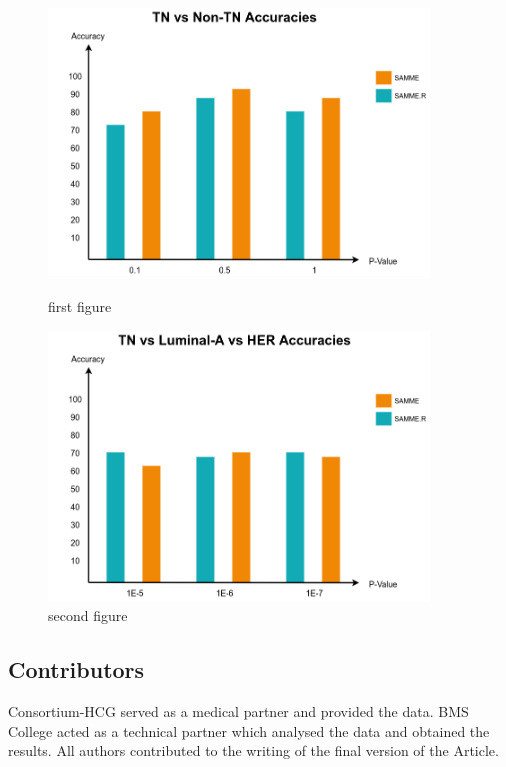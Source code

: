\documentclass[final,1p,times,twocolumn]{elsarticle}
\begin{document}
\begin{figure}
    \centering
    \begin{minipage}{0.45\textwidth}
        \centering
        \includegraphics[width=0.9\textwidth]{acc1.png} %
        \caption{first figure}
    \end{minipage}\hfill
    \begin{minipage}{0.45\textwidth}
        \centering
        \includegraphics[width=0.9\textwidth]{acc2.png} %
        \caption{second figure}
    \end{minipage}
\end{figure}


\subsection{Contributors}

Consortium-HCG served as a medical partner and provided the data. BMS College acted as a technical partner which analysed the data and obtained the results. All authors contributed to the writing of the final version of the Article.
\end{document}
